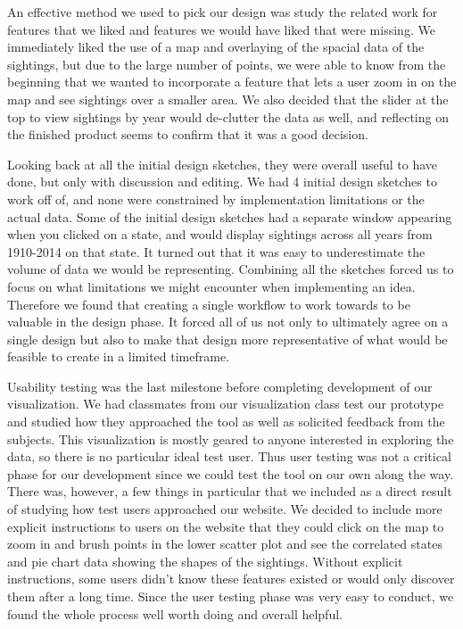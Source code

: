 \documentclass[journal]{vgtc}                %
\begin{document}
An effective method we used to pick our design was study the related work for features that we liked and features we would have liked that were missing. We immediately liked the use of a map and overlaying of the spacial data of the sightings, but due to the large number of points, we were able to know from the beginning that we wanted to incorporate a feature that lets a user zoom in on the map and see sightings over a smaller area. We also decided that the slider at the top to view sightings by year would de-clutter the data as well, and reflecting on the finished product seems to confirm that it was a good decision. 

Looking back at all the initial design sketches, they were overall useful to have done, but only with discussion and editing. We had 4 initial design sketches to work off of, and none were constrained by implementation limitations or the actual data. Some of the initial design sketches had a separate window appearing when you clicked on a state, and would display sightings across all years from 1910-2014 on that state. It turned out that it was easy to underestimate the volume of data we would be representing. Combining all the sketches forced us to focus on what limitations we might encounter when implementing an idea. Therefore we found that creating a single workflow to work towards to be valuable in the design phase. It forced all of us not only to ultimately agree on a single design but also to make that design more representative of what would be feasible to create in a limited timeframe. 

Usability testing was the last milestone before completing development of our visualization. We had classmates from our visualization class test our prototype and studied how they approached the tool as well as solicited feedback from the subjects. This visualization is mostly geared to anyone interested in exploring the data, so there is no particular ideal test user. Thus user testing was not a critical phase for our development since we could test the tool on our own along the way. There was, however, a few things in particular that we included as a direct result of studying how test users approached our website. We decided to include more explicit instructions to users on the website that they could click on the map to zoom in and brush points in the lower scatter plot and see the correlated states and pie chart data showing the shapes of the sightings. Without explicit instructions, some users didn't know these features existed or would only discover them after a long time. Since the user testing phase was very easy to conduct, we found the whole process well worth doing and overall helpful.
\end{document}

